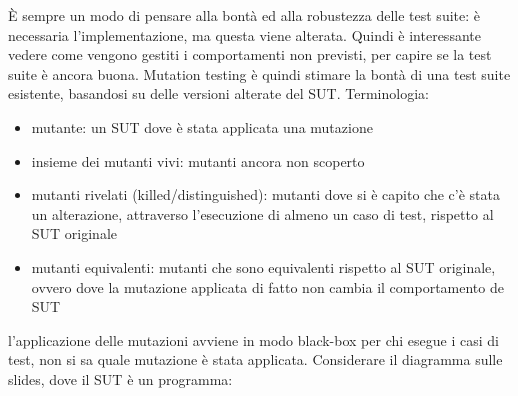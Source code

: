 \documentclass{article}
\begin{document}
È sempre un modo di pensare alla bontà ed alla robustezza delle test suite: è necessaria l'implementazione, ma questa viene alterata. Quindi è interessante vedere come vengono gestiti i comportamenti non previsti, per capire se la test suite è ancora buona. Mutation testing è quindi stimare la bontà di una test suite esistente,  basandosi su delle versioni alterate del SUT. Terminologia:
\begin{itemize}
\item mutante: un SUT dove è stata applicata una mutazione
\item insieme dei mutanti vivi: mutanti ancora non scoperto
\item mutanti rivelati (killed/distinguished): mutanti dove si è capito che c'è stata un alterazione, attraverso l'esecuzione di almeno un caso di test, rispetto al SUT originale
\item mutanti equivalenti: mutanti che sono equivalenti rispetto al SUT originale, ovvero dove la mutazione applicata di fatto non cambia il comportamento de SUT
\end{itemize}
l'applicazione delle mutazioni avviene in modo black-box per chi esegue i casi di test, non si sa quale mutazione è stata applicata. Considerare il diagramma sulle slides, dove il SUT è un programma:
\end{document}
